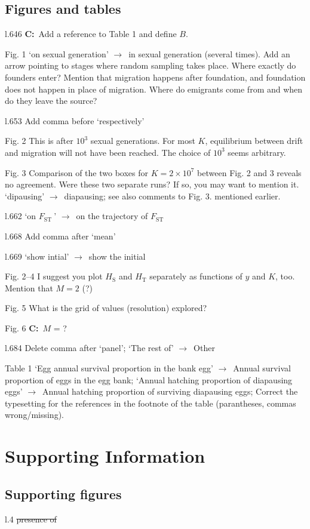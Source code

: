 \documentclass[11pt]{article}
\newenvironment{my_description}
{\begin{description}
  \setlength{\itemsep}{2pt}
  \setlength{\parskip}{0pt}
  \setlength{\parsep}{0pt}}
{\end{description}}
\newcommand{\ra}{$\rightarrow$\ }
\newcommand{\C}{\textbf{C:}\ }
\newcommand{\fst}{$F_{\mathrm{ST}}\ $}
\begin{document}
	
\subsection{Figures and tables}
\begin{my_description}
	\item[l.646] \C Add a reference to Table 1 and define $B$.
	\item[Fig. 1] `on sexual generation' \ra in sexual generation (several times). Add an arrow pointing to stages where random sampling takes place. Where exactly do founders enter? Mention that migration happens after foundation, and foundation does not happen in place of migration. Where do emigrants come from and when do they leave the source?
	\item[l.653] Add comma before `respectively'
	\item[Fig. 2] This is after $10^3$ sexual generations. For most $K$, equilibrium between drift and migration will not have been reached. The choice of $10^3$ seems arbitrary.
	\item[Fig. 3] Comparison of the two boxes for $K = 2\times10^7$ between Fig. 2 and 3 reveals no agreement. Were these two separate runs? If so, you may want to mention it. `dipausing' \ra diapausing; see also comments to Fig. 3. mentioned earlier.
	\item[l.662] `on \fst' \ra on the trajectory of \fst
	\item[l.668] Add comma after `mean'
	\item[l.669] `show intial' \ra show the initial
	\item[Fig. 2--4] I suggest you plot $H_\mathrm{S}$ and $H_\mathrm{T}$ separately as functions of $y$ and $K$, too.
	Mention that $M=2$ (?)
	\item[Fig. 5] What is the grid of values (resolution) explored?
	\item[Fig. 6] \C $M$ = ?
	\item[l.684] Delete comma after `panel';  `The rest of' \ra Other
	\item[Table 1] `Egg annual survival proportion in the bank egg' \ra Annual survival proportion of eggs in the egg bank; `Annual hatching proportion of diapausing eggs' \ra Annual hatching proportion of surviving diapausing eggs; Correct the typesetting for the references in the footnote of the table (parantheses, commas wrong/missing).
\end{my_description}

\section{Supporting Information}
\subsection{Supporting figures}

\begin{my_description}
	\item[l.4] \sout{presence of}
\end{my_description}



\end{document}

